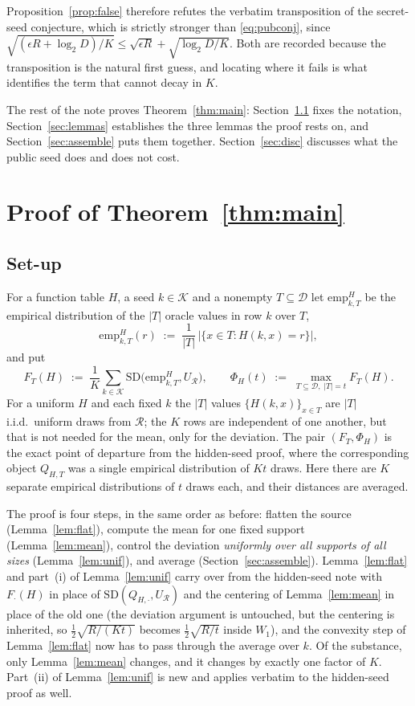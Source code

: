 \documentclass{conjura-solution}
\newcommand{\SD}{\mathrm{SD}}
\newcommand{\calK}{\mathcal{K}}
\newcommand{\calD}{\mathcal{D}}
\newcommand{\calR}{\mathcal{R}}
\newcommand{\emp}{\mathrm{emp}}
\theoremstyle{cjplain}
\begin{document}
Proposition~\ref{prop:false} therefore refutes the verbatim transposition of the secret-seed
conjecture, which is strictly stronger than \eqref{eq:pubconj}, since
$\sqrt{(\epsilon R + \log_2 D)/K} \le \sqrt{\epsilon R} + \sqrt{\log_2 D/K}$. Both are recorded
because the transposition is the natural first guess, and locating where it fails is what
identifies the term that cannot decay in $K$.

The rest of the note proves Theorem~\ref{thm:main}: Section~\ref{sec:setup} fixes the notation,
Section~\ref{sec:lemmas} establishes the three lemmas the proof rests on, and
Section~\ref{sec:assemble} puts them together. Section~\ref{sec:disc} discusses what the public
seed does and does not cost.

\section{Proof of Theorem~\ref{thm:main}}\label{sec:proof}

\subsection{Set-up}\label{sec:setup}

For a function table $H$, a seed $k \in \calK$ and a nonempty $T \subseteq \calD$ let
$\emp^{H}_{k,T}$ be the empirical distribution of the $|T|$ oracle values in row $k$ over $T$,
\[
  \emp^{H}_{k,T}(r) \;:=\; \frac{1}{|T|}\,\bigl|\{x \in T : H(k,x) = r\}\bigr| ,
\]
and put
\[
  F_{T}(H) \;:=\; \frac{1}{K}\sum_{k \in \calK} \SD\bigl(\emp^{H}_{k,T}, U_{\calR}\bigr),
  \qquad
  \Phi_{H}(t) \;:=\; \max_{T \subseteq \calD,\; |T| = t} F_{T}(H) .
\]
For a uniform $H$ and each fixed $k$ the $|T|$ values $\{H(k,x)\}_{x \in T}$ are $|T|$ i.i.d.\
uniform draws from $\calR$; the $K$ rows are independent of one another, but that is not needed for
the mean, only for the deviation. The pair $(F_{T}, \Phi_{H})$ is the exact point of departure from the hidden-seed proof,
where the corresponding object $Q_{H,T}$ was a single empirical distribution of $Kt$ draws. Here
there are $K$ separate empirical distributions of $t$ draws each, and their distances are averaged.

\smallskip
The proof is four steps, in the same order as before: flatten the source (Lemma~\ref{lem:flat}),
compute the mean for one fixed support (Lemma~\ref{lem:mean}), control the deviation \emph{uniformly
over all supports of all sizes} (Lemma~\ref{lem:unif}), and average (Section~\ref{sec:assemble}).
Lemma~\ref{lem:flat} and part~(i) of Lemma~\ref{lem:unif} carry over from the hidden-seed note with
$F_{\cdot}(H)$ in place of $\SD(Q_{H,\cdot},U_{\calR})$ and the centering of
Lemma~\ref{lem:mean} in place of the old one (the deviation argument is untouched, but the
centering is inherited, so $\tfrac12\sqrt{R/(Kt)}$ becomes $\tfrac12\sqrt{R/t}$ inside $W_{1}$),
and the convexity step of Lemma~\ref{lem:flat} now has to pass through the average over $k$. Of the
substance, only Lemma~\ref{lem:mean} changes, and it changes by exactly one factor of $K$.
Part~(ii) of Lemma~\ref{lem:unif} is new and applies verbatim to the hidden-seed proof as well.
\end{document}
